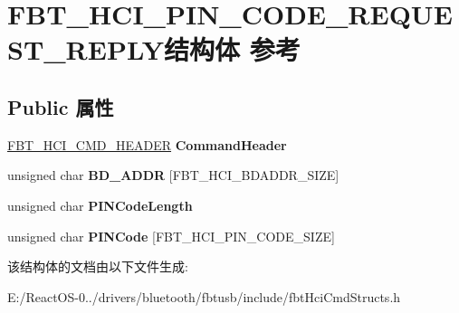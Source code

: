 \hypertarget{struct_f_b_t___h_c_i___p_i_n___c_o_d_e___r_e_q_u_e_s_t___r_e_p_l_y}{}\section{F\+B\+T\+\_\+\+H\+C\+I\+\_\+\+P\+I\+N\+\_\+\+C\+O\+D\+E\+\_\+\+R\+E\+Q\+U\+E\+S\+T\+\_\+\+R\+E\+P\+L\+Y结构体 参考}
\label{struct_f_b_t___h_c_i___p_i_n___c_o_d_e___r_e_q_u_e_s_t___r_e_p_l_y}
\subsection*{Public 属性}
\begin{DoxyCompactItemize}
\item 
\mbox{\label{struct_f_b_t___h_c_i___p_i_n___c_o_d_e___r_e_q_u_e_s_t___r_e_p_l_y_a0efff71983df3f0b92dff985b97d90af}} 
\hyperlink{struct_f_b_t___h_c_i___c_m_d___h_e_a_d_e_r}{F\+B\+T\+\_\+\+H\+C\+I\+\_\+\+C\+M\+D\+\_\+\+H\+E\+A\+D\+ER} {\bfseries Command\+Header}
\item 
\mbox{\label{struct_f_b_t___h_c_i___p_i_n___c_o_d_e___r_e_q_u_e_s_t___r_e_p_l_y_addfb28f4e701ea4fb765f93a85c8f840}} 
unsigned char {\bfseries B\+D\+\_\+\+A\+D\+DR} \mbox{[}F\+B\+T\+\_\+\+H\+C\+I\+\_\+\+B\+D\+A\+D\+D\+R\+\_\+\+S\+I\+ZE\mbox{]}
\item 
\mbox{\label{struct_f_b_t___h_c_i___p_i_n___c_o_d_e___r_e_q_u_e_s_t___r_e_p_l_y_a40d64ad856f4fd2e7336cc04a11da9dc}} 
unsigned char {\bfseries P\+I\+N\+Code\+Length}
\item 
\mbox{\label{struct_f_b_t___h_c_i___p_i_n___c_o_d_e___r_e_q_u_e_s_t___r_e_p_l_y_a244d51c5643fc63199c67cae81f353c9}} 
unsigned char {\bfseries P\+I\+N\+Code} \mbox{[}F\+B\+T\+\_\+\+H\+C\+I\+\_\+\+P\+I\+N\+\_\+\+C\+O\+D\+E\+\_\+\+S\+I\+ZE\mbox{]}
\end{DoxyCompactItemize}


该结构体的文档由以下文件生成\+:\begin{DoxyCompactItemize}
\item 
E\+:/\+React\+O\+S-\/0../drivers/bluetooth/fbtusb/include/fbt\+Hci\+Cmd\+Structs.\+h\end{DoxyCompactItemize}
